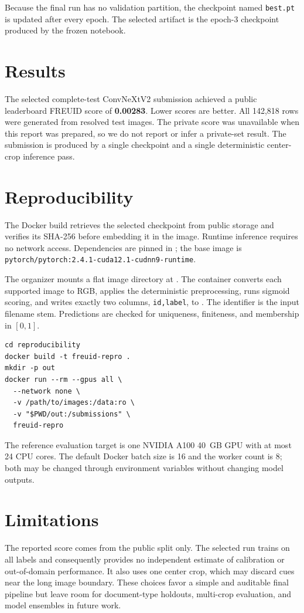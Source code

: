 \documentclass[10pt,twocolumn]{article}
\begin{document}
Because the final run has no validation partition, the checkpoint named
\texttt{best.pt} is updated after every epoch. The selected artifact is the
epoch-3 checkpoint produced by the frozen notebook.

\section{Results}
The selected complete-test ConvNeXtV2 submission achieved a public leaderboard
FREUID score of \textbf{0.00283}. Lower scores are better. All 142,818 rows were
generated from resolved test images. The private score was unavailable when
this report was prepared, so we do not report or infer a private-set result.
The submission is produced by a single checkpoint and a single deterministic
center-crop inference pass.

\section{Reproducibility}
The Docker build retrieves the selected checkpoint from public storage and
verifies its SHA-256 before embedding it in the image. Runtime inference
requires no network access. Dependencies are pinned in
; the base image is
\texttt{pytorch/pytorch:2.4.1-cuda12.1-cudnn9-runtime}.

The organizer mounts a flat image directory at . The container
converts each supported image to RGB, applies the deterministic preprocessing,
runs sigmoid scoring, and writes exactly two columns, \texttt{id,label}, to
. The identifier is the input filename stem.
Predictions are checked for uniqueness, finiteness, and membership in $[0,1]$.

\begin{small}
\begin{verbatim}
cd reproducibility
docker build -t freuid-repro .
mkdir -p out
docker run --rm --gpus all \
  --network none \
  -v /path/to/images:/data:ro \
  -v "$PWD/out:/submissions" \
  freuid-repro
\end{verbatim}
\end{small}

The reference evaluation target is one NVIDIA A100 40~GB GPU with at most 24
CPU cores. The default Docker batch size is 16 and the worker count is 8; both
may be changed through environment variables without changing model outputs.

\section{Limitations}
The reported score comes from the public split only. The selected run trains on
all labels and consequently provides no independent estimate of calibration or
out-of-domain performance. It also uses one center crop, which may discard cues
near the long image boundary. These choices favor a simple and auditable final
pipeline but leave room for document-type holdouts, multi-crop evaluation, and
model ensembles in future work.
\end{document}
